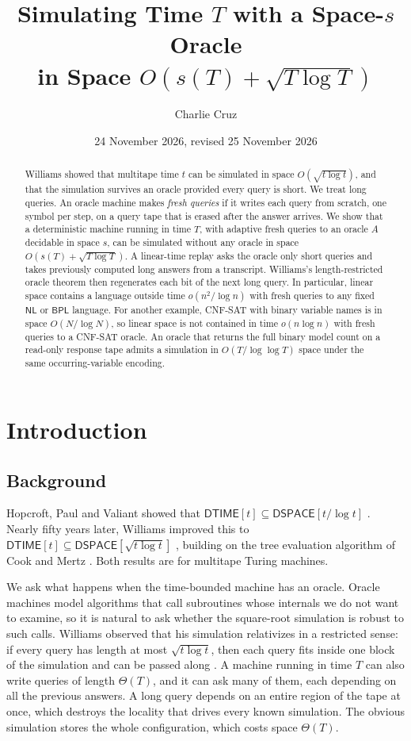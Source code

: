 \documentclass[11pt]{article}
\title{Simulating Time $T$ with a Space-$s$ Oracle\texorpdfstring{\\}{ }in Space $O(s(T)+\sqrt{T\log T})$}
\author{Charlie Cruz}
\date{24 November 2026, revised 25 November 2026}
\theoremstyle{remark}
\newcommand{\DTIME}{\mathsf{DTIME}}
\newcommand{\DSPACE}{\mathsf{DSPACE}}
\newcommand{\SAT}{\textup{\textsc{CNF-SAT}}}
\begin{document}
\maketitle
\begin{abstract}
Williams showed that multitape time $t$ can be simulated in space
$O(\sqrt{t\log t})$, and that the simulation survives an oracle provided
every query is short. We treat long queries. An oracle machine makes
\emph{fresh queries} if it writes each query from scratch, one symbol per
step, on a query tape that is erased after the answer arrives. We show
that a deterministic machine running in time $T$, with adaptive fresh
queries to an oracle $A$ decidable in space $s$, can be simulated without
any oracle in space $O(s(T)+\sqrt{T\log T})$. A linear-time replay
asks the oracle only short queries and takes previously computed long
answers from a transcript. Williams's length-restricted oracle theorem
then regenerates each bit of the next long query. In particular, linear
space contains a language outside time $o(n^2/\log n)$ with fresh queries
to any fixed $\mathsf{NL}$ or $\mathsf{BPL}$ language.
For another example, \SAT{} with binary variable names is
in space $O(N/\log N)$, so linear space is not contained in time
$o(n\log n)$ with fresh queries to a \SAT{} oracle. An oracle that
returns the full binary model count on a read-only response tape
admits a simulation in $O(T/\log\log T)$ space under the same
occurring-variable encoding.
\end{abstract}

\section{Introduction}

\subsection{Background}
Hopcroft, Paul and Valiant showed that
$\DTIME[t]\subseteq\DSPACE[t/\log t]$ \cite{HPV}. Nearly fifty years
later, Williams improved this to
$\DTIME[t]\subseteq\DSPACE[\sqrt{t\log t}]$ \cite{Wil25}, building on the
tree evaluation algorithm of Cook and Mertz \cite{CM}. Both results are
for multitape Turing machines.

We ask what happens when the time-bounded machine has an oracle. Oracle
machines model algorithms that call subroutines whose internals we do
not want to examine, so it is natural to ask whether the square-root
simulation is robust to such calls. Williams observed that his
simulation relativizes in a restricted sense: if every query has length
at most $\sqrt{t\log t}$, then each query fits inside one block of the
simulation and can be passed along \cite[Theorem~5.1]{Wil25}. A machine
running in time $T$ can also write queries of length $\Theta(T)$, and it
can ask many of them, each depending on all the previous answers. A long
query depends on an entire region of the tape at once, which destroys
the locality that drives every known simulation. The obvious simulation
stores the whole configuration, which costs space $\Theta(T)$.
\end{document}
